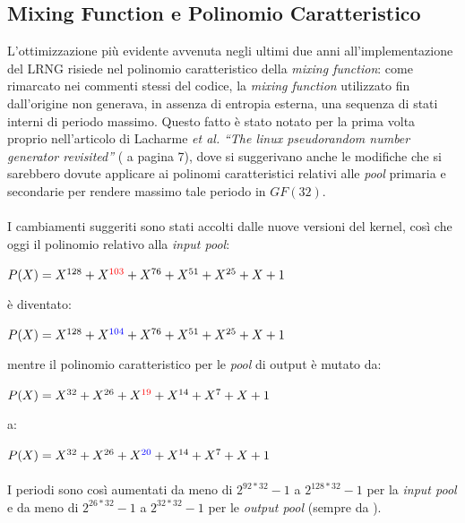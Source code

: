 \documentclass{article}
\begin{document}
 
 \subsection{Mixing Function e Polinomio Caratteristico}
 \label{mixingfunctionchanges}
 L'ottimizzazione più evidente avvenuta negli ultimi due anni
 all'implementazione del LRNG risiede nel polinomio caratteristico della
 \emph{mixing function}: come rimarcato nei commenti stessi del codice, la
 \emph{mixing function} utilizzato fin dall'origine non generava, in assenza
 di entropia esterna, una sequenza di stati interni di periodo massimo.
 Questo fatto è stato notato per la prima volta proprio nell'articolo di
 Lacharme \emph{et al.} \emph{``The linux pseudorandom
number generator revisited''} (\cite{lach} a pagina 7), dove si suggerivano
anche le modifiche che si sarebbero dovute applicare ai polinomi caratteristici
relativi alle \emph{pool} primaria e secondarie per rendere massimo tale periodo
in $GF(32)$.

\paragraph{} I cambiamenti suggeriti sono stati accolti dalle nuove versioni
del kernel, così che oggi il polinomio relativo alla \emph{input pool}:
\begin{center}
$P(X)=X^{128}+X^{\textcolor{red}{103}}+X^{76}+X^{51}+X^{25}+X+1$
\end{center}
è diventato:
\begin{center}
$P(X)=X^{128}+X^{\textcolor{blue}{104}}+X^{76}+X^{51}+X^{25}+X+1$
\end{center}
mentre il polinomio caratteristico per le \emph{pool} di output è mutato da:
\begin{center}
$P(X)=X^{32}+X^{26}+X^{\textcolor{red}{19}}+X^{14}+X^{7}+X+1$
\end{center}
a:
\begin{center}
$P(X)=X^{32}+X^{26}+X^{\textcolor{blue}{20}}+X^{14}+X^{7}+X+1$
\end{center}
\paragraph{}I periodi sono così aumentati da meno di $2^{92*32}-1$ a
$2^{128*32}-1$ per la \emph{input pool} e da meno di $2^{26*32}-1$ a $2^{32*32}-1$ per le
\emph{output pool} (sempre da \cite{lach}).
\end{document}
